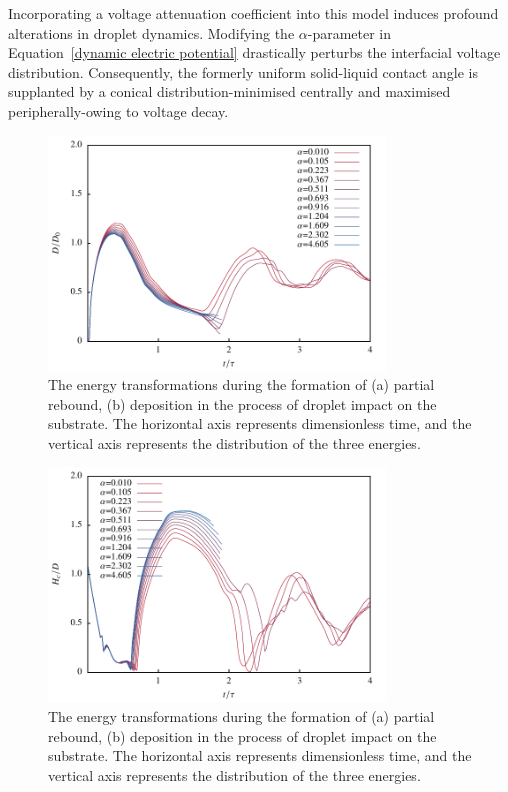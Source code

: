 \documentclass[lineno]{cls/jfm}
\begin{document}
 Incorporating a voltage attenuation coefficient into this model induces profound alterations in droplet dynamics. Modifying the $\alpha$-parameter in Equation~\ref{dynamic electric potential} drastically perturbs the interfacial voltage distribution. Consequently, the formerly uniform solid-liquid contact angle is supplanted by a conical distribution-minimised centrally and maximised peripherally-owing to voltage decay.



 \begin{figure}
  \centerline{\includegraphics[width=0.8\textwidth]{fig/dropR.pdf}}
  \caption{The energy transformations during the formation of (a) partial rebound, (b) deposition in the process of droplet impact on the substrate. The horizontal axis represents dimensionless time, and the vertical axis represents the distribution of the three energies.}
 \label{fig:energy}
 \end{figure}

 \begin{figure}
  \centerline{\includegraphics[width=0.8\textwidth]{fig/dropH.pdf}}
  \caption{The energy transformations during the formation of (a) partial rebound, (b) deposition in the process of droplet impact on the substrate. The horizontal axis represents dimensionless time, and the vertical axis represents the distribution of the three energies.}
 \label{fig:energy}
 \end{figure}
\end{document}
